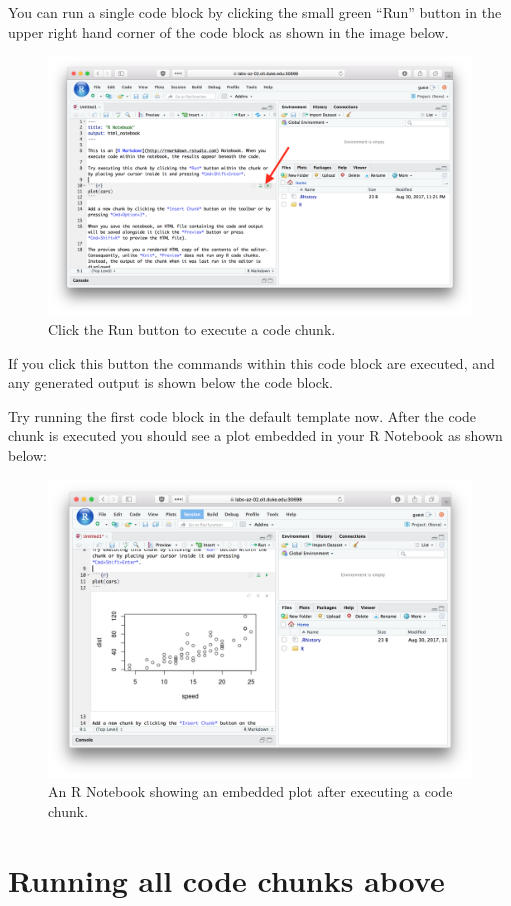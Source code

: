 \documentclass[]{book}
\theoremstyle{definition}
\theoremstyle{definition}
\theoremstyle{definition}
\theoremstyle{remark}
\begin{document}
You can run a single code block by clicking the small green ``Run''
button in the upper right hand corner of the code block as shown in the
image below.

\begin{figure}

{\centering \includegraphics[width=0.6\linewidth]{./figures/fig-run-code-chunk} 

}

\caption{Click the Run button to execute a code chunk.}\label{fig:unnamed-chunk-76}
\end{figure}

If you click this button the commands within this code block are
executed, and any generated output is shown below the code block.

Try running the first code block in the default template now. After the
code chunk is executed you should see a plot embedded in your R Notebook
as shown below:

\begin{figure}

{\centering \includegraphics[width=0.6\linewidth]{./figures/fig-rstudio-after-run-chunk} 

}

\caption{An R Notebook showing an embedded plot after executing a code chunk.}\label{fig:unnamed-chunk-77}
\end{figure}

\hypertarget{running-all-code-chunks-above}{%
\section{Running all code chunks
above}\label{running-all-code-chunks-above}}
\end{document}
